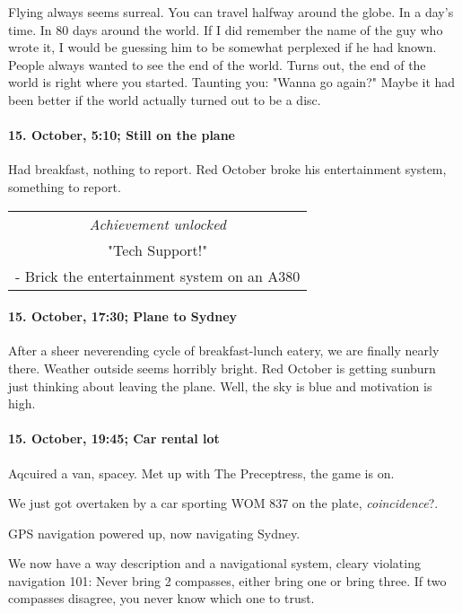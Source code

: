 Flying always seems surreal.
You can travel halfway around the globe.
In a day's time.
In 80 days around the world.
If I did remember the name of the guy who wrote it, I would be guessing him to be somewhat perplexed if he had known.
People always wanted to see the end of the world.
Turns out, the end of the world is right where you started.
Taunting you: "Wanna go again?"
Maybe it had been better if the world actually turned out to be a disc.

\paragraph{15. October, 5:10; Still on the plane}
Had breakfast, nothing to report.
Red October broke his entertainment system, something to report.

\begin{center}
\begin{tabular}{||c||}
\emph{Achievement unlocked}\\
"Tech Support!"\\
\multicolumn{1}{||p{0.8\textwidth}||}{\footnotesize - Brick the entertainment system on an A380} \\
\end{tabular}
\end{center}

\paragraph{15. October, 17:30; Plane to Sydney}
After a sheer neverending cycle of breakfast-lunch eatery, we are finally nearly there.
Weather outside seems horribly bright.
Red October is getting sunburn just thinking about leaving the plane.
Well, the sky is blue and motivation is high.

\paragraph{15. October, 19:45; Car rental lot}
Aqcuired a van, spacey.
Met up with The Preceptress, the game is on.

We just got overtaken by a car sporting WOM 837 on the plate, \emph{coincidence}?.

GPS navigation powered up, now navigating Sydney.

We now have a way description and a navigational system, cleary violating navigation 101: Never bring 2 compasses, either bring one or bring three.
If two compasses disagree, you never know which one to trust.

